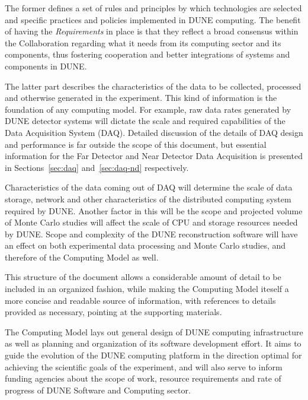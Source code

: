 \noindent
The former defines a set of rules and principles by which technologies are selected and specific practices and policies implemented in DUNE computing.
The benefit of having the \textit{Requirements} in place is that they reflect a broad consensus within the Collaboration regarding what it needs from
its computing sector and its components, thus fostering cooperation and better integrations of systems and components in DUNE.

The latter part describes the characteristics of the data to be collected, processed and otherwise generated in the experiment.
This kind of information is the foundation of any computing model.
For example, raw data rates generated by DUNE detector systems will dictate the scale and required capabilities of the Data
Acquisition System (DAQ).  Detailed discussion of the details of DAQ design and performance is far outside the scope of this
document, but essential information for the Far Detector and Near Detector Data Acquisition is presented in Sections~\ref{sec:daq}
and~\ref{sec:daq-nd} respectively.

Characteristics of the data coming out of DAQ will determine the scale of data storage, network
and other characteristics of the distributed computing system required by DUNE. Another factor in this will be the scope and projected
volume of Monte Carlo studies  will affect the scale of CPU and storage resources needed by DUNE.  Scope and complexity of the DUNE
reconstruction software will have an effect on both experimental data processing and Monte Carlo studies, and therefore of the
Computing Model as well.

This structure of the document allows a considerable amount of detail to be included in an organized fashion,
while making the Computing Model iteself a more concise and readable source of information, with
references to details provided as necessary, pointing at the supporting materials.

The Computing Model lays out general design of DUNE computing infrastructure as well as planning and
organization of its software development effort. It aims to guide the evolution of the DUNE computing
platform in the direction optimal for achieving the scientific goals of the experiment, and will also serve
to inform funding agencies about the scope of work, resource requirements and rate of progress of 
DUNE Software and Computing sector.

